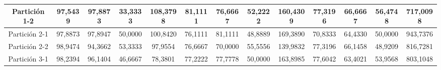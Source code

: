 \documentclass[12pt]{article}
\begin{document}
\begin{table}[]
{\begin{tabular}{|c|cccc|cccc|cccc|}
Partición 1-2 & \multicolumn{1}{c|}{97,5439}                                                  & \multicolumn{1}{c|}{97,8873}                                                 & \multicolumn{1}{c|}{33,3333} & 108,3798 & \multicolumn{1}{c|}{81,1111}                                                  & \multicolumn{1}{c|}{76,6667}                                                 & \multicolumn{1}{c|}{52,2222} & 160,4309 & \multicolumn{1}{c|}{77,3196}                                                  & \multicolumn{1}{c|}{66,6667}                                                 & \multicolumn{1}{c|}{56,4748} & 717,0098 \\ \hline
Partición 2-1 & \multicolumn{1}{c|}{97,8873}                                                  & \multicolumn{1}{c|}{97,8947}                                                 & \multicolumn{1}{c|}{50,0000} & 100,8420 & \multicolumn{1}{c|}{76,1111}                                                  & \multicolumn{1}{c|}{81,1111}                                                 & \multicolumn{1}{c|}{48,8889} & 169,3890 & \multicolumn{1}{c|}{70,8333}                                                  & \multicolumn{1}{c|}{64,4330}                                                 & \multicolumn{1}{c|}{50,0000} & 943,7376 \\ \hline
Partición 2-2 & \multicolumn{1}{c|}{98,9474}                                                  & \multicolumn{1}{c|}{94,3662}                                                 & \multicolumn{1}{c|}{53,3333} & 97,9554  & \multicolumn{1}{c|}{76,6667}                                                  & \multicolumn{1}{c|}{70,0000}                                                 & \multicolumn{1}{c|}{55,5556} & 139,9832 & \multicolumn{1}{c|}{77,3196}                                                  & \multicolumn{1}{c|}{66,1458}                                                 & \multicolumn{1}{c|}{48,9209} & 816,7281 \\ \hline
Partición 3-1 & \multicolumn{1}{c|}{98,2394}                                                  & \multicolumn{1}{c|}{96,1404}                                                 & \multicolumn{1}{c|}{46,6667} & 78,3801  & \multicolumn{1}{c|}{77,2222}                                                  & \multicolumn{1}{c|}{77,7778}                                                 & \multicolumn{1}{c|}{50,0000} & 163,8985 & \multicolumn{1}{c|}{77,6042}                                                  & \multicolumn{1}{c|}{63,4021}                                                 & \multicolumn{1}{c|}{53,9568} & 803,1048 \\ \hline

\end{tabular}}
\end{table}
\end{document}
